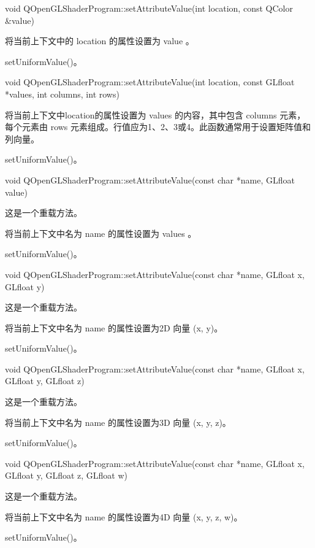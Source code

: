 void QOpenGLShaderProgram::setAttributeValue(int location, const QColor \&value)

将当前上下文中的 location 的属性设置为 value 。

\begin{seeAlso}
setUniformValue()。
\end{seeAlso}

void QOpenGLShaderProgram::setAttributeValue(int location, const GLfloat *values, int columns, int rows)

将当前上下文中location的属性设置为 values 的内容，其中包含 columns 元素，每个元素由 rows 元素组成。行值应为1、2、3或4。此函数通常用于设置矩阵值和列向量。

\begin{seeAlso}
setUniformValue()。
\end{seeAlso}

void QOpenGLShaderProgram::setAttributeValue(const char *name, GLfloat value)

这是一个重载方法。

将当前上下文中名为 name 的属性设置为 values 。

\begin{seeAlso}
setUniformValue()。
\end{seeAlso}

void QOpenGLShaderProgram::setAttributeValue(const char *name, GLfloat x, GLfloat y)

这是一个重载方法。

将当前上下文中名为 name 的属性设置为2D 向量 (x, y)。

\begin{seeAlso}
setUniformValue()。
\end{seeAlso}

void QOpenGLShaderProgram::setAttributeValue(const char *name, GLfloat x, GLfloat y, GLfloat z)

这是一个重载方法。

将当前上下文中名为 name 的属性设置为3D 向量 (x, y, z)。


\begin{seeAlso}
setUniformValue()。
\end{seeAlso}

void QOpenGLShaderProgram::setAttributeValue(const char *name, GLfloat x, GLfloat y, GLfloat z, GLfloat w)

这是一个重载方法。

将当前上下文中名为 name 的属性设置为4D 向量 (x, y, z, w)。


\begin{seeAlso}
setUniformValue()。
\end{seeAlso}

